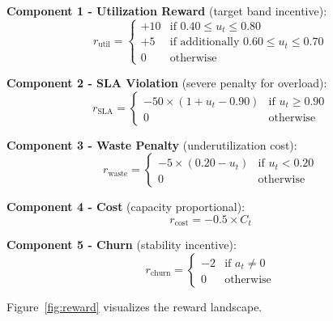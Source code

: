 \documentclass[conference]{IEEEtran}
\begin{document}
\textbf{Component 1 - Utilization Reward} (target band incentive):
\begin{equation}
r_{\text{util}} = \begin{cases}
+10 & \text{if } 0.40 \leq u_t \leq 0.80 \\
+5 & \text{if additionally } 0.60 \leq u_t \leq 0.70 \\
0 & \text{otherwise}
\end{cases}
\end{equation}

\textbf{Component 2 - SLA Violation} (severe penalty for overload):
\begin{equation}
r_{\text{SLA}} = \begin{cases}
-50 \times (1 + u_t - 0.90) & \text{if } u_t \geq 0.90 \\
0 & \text{otherwise}
\end{cases}
\end{equation}

\textbf{Component 3 - Waste Penalty} (underutilization cost):
\begin{equation}
r_{\text{waste}} = \begin{cases}
-5 \times (0.20 - u_t) & \text{if } u_t < 0.20 \\
0 & \text{otherwise}
\end{cases}
\end{equation}

\textbf{Component 4 - Cost} (capacity proportional):
\begin{equation}
r_{\text{cost}} = -0.5 \times C_t
\end{equation}

\textbf{Component 5 - Churn} (stability incentive):
\begin{equation}
r_{\text{churn}} = \begin{cases}
-2 & \text{if } a_t \neq 0 \\
0 & \text{otherwise}
\end{cases}
\end{equation}

Figure~\ref{fig:reward} visualizes the reward landscape.
\end{document}
